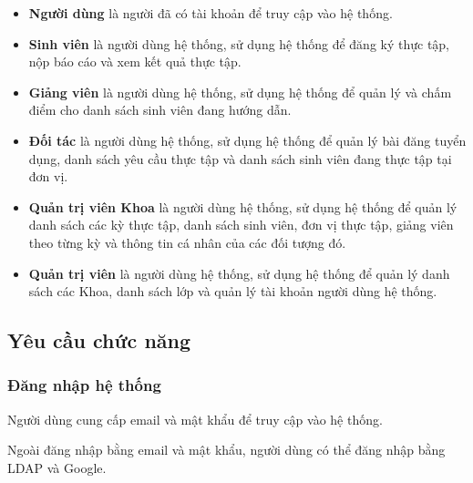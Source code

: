 \documentclass[./../main.tex]{subfiles}
\begin{document}
\begin{itemize}
	\item

	      \textbf{Người dùng} là người đã có tài khoản để truy cập vào hệ thống.

	\item

	      \textbf{Sinh viên} là người dùng hệ thống, sử dụng hệ thống để đăng ký
	      thực tập, nộp báo cáo và xem kết quả thực tập.

	\item

	      \textbf{Giảng viên} là người dùng hệ thống, sử dụng hệ thống để quản
	      lý và chấm điểm cho danh sách sinh viên đang hướng dẫn.

	\item

	      \textbf{Đối tác} là người dùng hệ thống, sử dụng hệ thống để quản lý
	      bài đăng tuyển dụng, danh sách yêu cầu thực tập và danh sách sinh viên
	      đang thực tập tại đơn vị.

	\item

	      \textbf{Quản trị viên Khoa} là người dùng hệ thống, sử dụng hệ thống
	      để quản lý danh sách các kỳ thực tập, danh sách sinh viên, đơn vị thực
	      tập, giảng viên theo từng kỳ và thông tin cá nhân của các đối tượng
	      đó.

	\item

	      \textbf{Quản trị viên} là người dùng hệ thống, sử dụng hệ thống để
	      quản lý danh sách các Khoa, danh sách lớp và quản lý tài khoản người
	      dùng hệ thống.

\end{itemize}

\subsection{Yêu cầu chức năng}

\hypertarget{ux111ux103ng-nhux1eadp-hux1ec7-thux1ed1ng}{%
	\subsubsection{Đăng nhập hệ
		thống}\label{ux111ux103ng-nhux1eadp-hux1ec7-thux1ed1ng}}

Người dùng cung cấp email và mật khẩu để truy cập vào hệ thống.

Ngoài đăng nhập bằng email và mật khẩu, người dùng có thể đăng nhập bằng
LDAP và Google.
\end{document}
